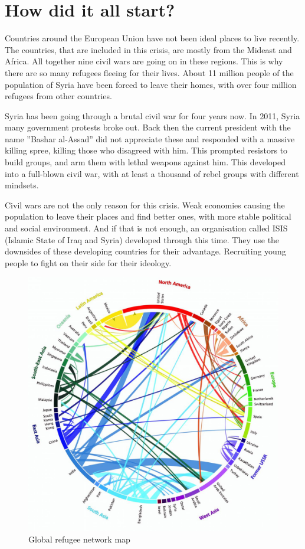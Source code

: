 
\section{How did it all start?}

Countries around the European Union have not been ideal places to live recently. The countries, that are included in this crisis, are mostly from the Mideast and Africa. All together nine civil wars are going on in these regions. This is why there are so many refugees fleeing for their lives. About 11 million people of the population of Syria have been forced to leave their homes, with over four million refugees from other countries.

Syria has been going through a brutal civil war for four years now. In 2011, Syria many government protests broke out.
Back then the current president with the name ''Bashar al-Assad'' did not appreciate these and responded with a massive killing spree, killing those who disagreed with him. This prompted resistors to build groups, and arm them with lethal weapons against him. This developed into a full-blown civil war, with at least a thousand of rebel groups with different mindsets.

Civil wars are not the only reason for this crisis. Weak economies causing the population to leave their places and find better ones, with more stable political and social environment. And if that is not enough, an organisation called ISIS (Islamic State of Iraq and Syria) developed through this time. They use the downsides of these developing countries for their advantage. Recruiting young people to fight on their side for their ideology.

\begin{figure}[!h]
	\begin{center}
		\includegraphics[width=0.68\linewidth]{images/refugee_map}
		\caption{Global refugee network map}
	\end{center}
\end{figure}

